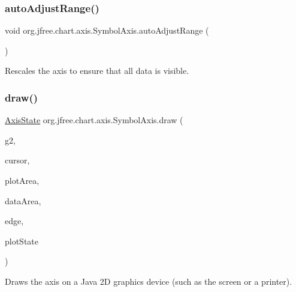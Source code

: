 \subsubsection{\texorpdfstring{auto\+Adjust\+Range()}{autoAdjustRange()}}
{\footnotesize\ttfamily void org.\+jfree.\+chart.\+axis.\+Symbol\+Axis.\+auto\+Adjust\+Range (\begin{DoxyParamCaption}{ }\end{DoxyParamCaption})\hspace{0.3cm}{\ttfamily [protected]}}

Rescales the axis to ensure that all data is visible. \mbox{\label{classorg_1_1jfree_1_1chart_1_1axis_1_1_symbol_axis_abd3d542d3230dc9ca14827208c9e8df5}} 
\subsubsection{\texorpdfstring{draw()}{draw()}}
{\footnotesize\ttfamily \mbox{\hyperlink{classorg_1_1jfree_1_1chart_1_1axis_1_1_axis_state}{Axis\+State}} org.\+jfree.\+chart.\+axis.\+Symbol\+Axis.\+draw (\begin{DoxyParamCaption}\item[{Graphics2D}]{g2,  }\item[{double}]{cursor,  }\item[{Rectangle2D}]{plot\+Area,  }\item[{Rectangle2D}]{data\+Area,  }\item[{Rectangle\+Edge}]{edge,  }\item[{\mbox{\hyperlink{classorg_1_1jfree_1_1chart_1_1plot_1_1_plot_rendering_info}{Plot\+Rendering\+Info}}}]{plot\+State }\end{DoxyParamCaption})}

Draws the axis on a Java 2D graphics device (such as the screen or a printer).


